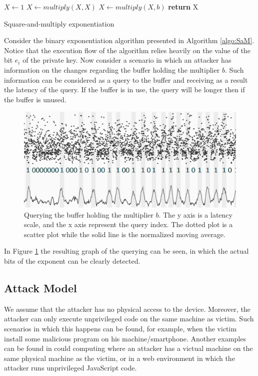 \begin{algorithm}
    $X \leftarrow 1$
    {
    $X \leftarrow multiply(X,X)$
    {
    $X \leftarrow multiply(X,b)$
    }
    }
    \textbf{return} X
    \caption{Square-and-multiply exponentiation}
    \label{algo:SaM}
\end{algorithm}

Consider the binary exponentiation algorithm presented in Algorithm \ref{algo:SaM}. Notice that the execution flow of the algorithm relies heavily on the value of the bit $e_i$ of the private key. Now consider a scenario in which an attacker has information on the changes regarding the buffer holding the multiplier $b$. Such information can be considered as a query to the buffer and receiving as a result the latency of the query. If the buffer is in use, the query will be longer then if the buffer is unused.

\begin{figure}
    \centering
    \includegraphics[width=\textwidth]{images/PPSM.PNG}
    \caption{Querying the buffer holding the multiplier $b$. The y axis is a latency scale, and the x axis represent the query index. The dotted plot is a scatter plot while the solid line is the normalized moving average.}
    \label{fig:PPSQ}
\end{figure}

In Figure \ref{fig:PPSQ} the resulting graph of the querying can be seen, in which the actual bits of the exponent can be clearly detected.

\subsection{Attack Model}
We assume that the attacker has no physical access to the device. Moreover, the attacker can only execute unprivileged code on the same machine as victim. Such scenarios in which this happens can be found, for example, when the victim install some malicious program on his machine/smartphone. Another examples can be found in could computing where an attacker has a victual machine on the same physical machine as the victim, or in a web environment in which the attacker runs unprivileged JavaScript code.


